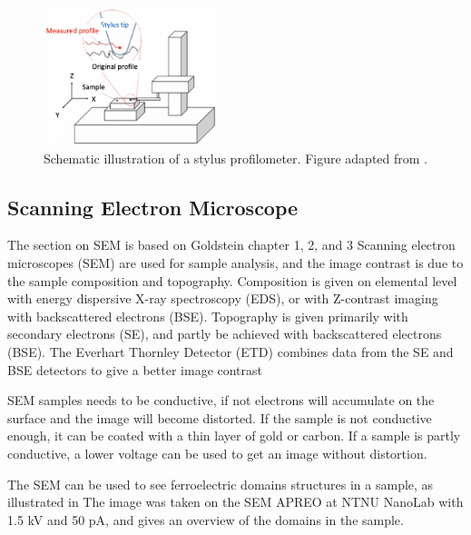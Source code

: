 \begin{figure}
    \centering
    \includegraphics[width=0.45\textwidth]{figures/profilometer.png}
    \caption{Schematic illustration of a stylus profilometer. Figure adapted from \cite{profilometer_manual}.}
    \label{fig:stylus_profilometer}
\end{figure}


\subsection{Scanning Electron Microscope}

\noindent The section on SEM is based on Goldstein chapter 1, 2, and 3 %
Scanning electron microscopes (SEM) are used for sample analysis, and the image contrast is due to the sample composition and topography.
Composition is given on elemental level with energy dispersive X-ray spectroscopy (EDS), or with Z-contrast imaging with backscattered electrons (BSE).
Topography is given primarily with secondary electrons (SE), and partly be achieved with backscattered electrons (BSE).
The Everhart Thornley Detector (ETD) combines data from the SE and BSE detectors to give a better image contrast %


SEM samples needs to be conductive, if not electrons will accumulate on the surface and the image will become distorted.
If the sample is not conductive enough, it can be coated with a thin layer of gold or carbon.
If a sample is partly conductive, a lower voltage can be used to get an image without distortion.

The SEM can be used to see ferroelectric domains structures in a sample, as illustrated in %
The image was taken on the SEM APREO at NTNU NanoLab with 1.5 kV and 50 pA, and gives an overview of the domains in the sample.

